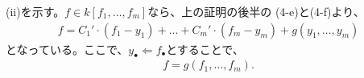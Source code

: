 \begin{myproof}
  (ii)を示す。$f\in k[f_1,\dots,f_m]$なら、上の証明の後半の
  (4-e)と(4-f)より、
  \begin{align}
    f = C_1' \cdot (f_1-y_1) + \dots + C_m'\cdot (f_m-y_m) + g(y_1,\dots,y_m)
  \end{align}
  となっている。ここで、$y_\bullet \Leftarrow f_\bullet$とすることで、
  \begin{align}
    f = g(f_1,\dots,f_m).
  \end{align}

\end{myproof}
